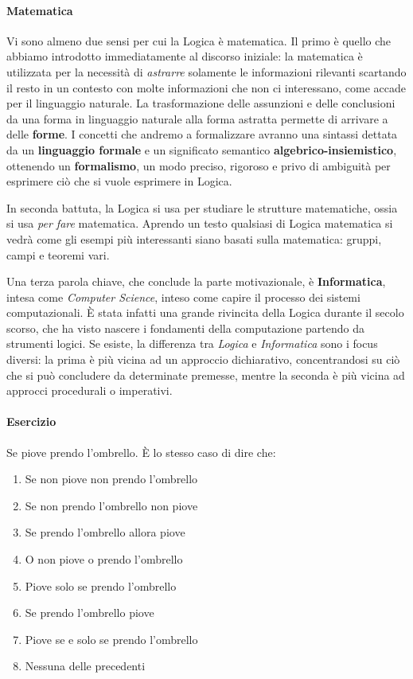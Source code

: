 \paragraph{Matematica}
Vi sono almeno due sensi per cui la Logica è matematica. Il primo è quello che abbiamo 
introdotto immediatamente al discorso iniziale: la matematica è utilizzata per 
la necessità di \textit{astrarre} solamente le informazioni rilevanti scartando 
il resto in un contesto con molte informazioni che non ci interessano, come 
accade per il linguaggio naturale. La trasformazione delle assunzioni e delle 
conclusioni da una forma in linguaggio naturale alla forma astratta permette 
di arrivare a delle \textbf{forme}. I concetti che andremo a formalizzare 
avranno una sintassi dettata da un \textbf{linguaggio formale} e un significato 
semantico \textbf{algebrico-insiemistico}, ottenendo un \textbf{formalismo}, un
modo preciso, rigoroso e privo di ambiguità per esprimere ciò che si vuole 
esprimere in Logica. 

In seconda battuta, la Logica si usa per studiare le strutture matematiche, 
ossia si usa \textit{per fare} matematica. Aprendo un testo qualsiasi di 
Logica matematica si vedrà come gli esempi più interessanti siano basati 
sulla matematica: gruppi, campi e teoremi vari. \newline


\noindent
Una terza parola chiave, che conclude la parte motivazionale, è \textbf{Informatica}, 
intesa come \textit{Computer Science}, inteso come capire il processo dei 
sistemi computazionali. \`E stata infatti una grande rivincita della Logica 
durante il secolo scorso, che ha visto nascere i fondamenti della computazione 
partendo da strumenti logici. Se esiste, la differenza tra \textit{Logica} 
e \textit{Informatica} sono i focus diversi: la prima è più vicina ad un 
approccio dichiarativo, concentrandosi su ciò che si può concludere da 
determinate premesse, mentre la seconda è più vicina ad approcci 
procedurali o imperativi.

\paragraph{Esercizio}
Se piove prendo l'ombrello. \`E lo stesso caso di dire che: 
\begin{enumerate}
  \setlength\itemsep{0pt}
  \item Se non piove non prendo l'ombrello
  \item Se non prendo l'ombrello non piove
  \item Se prendo l'ombrello allora piove
  \item O non piove o prendo l'ombrello 
  \item Piove solo se prendo l'ombrello 
  \item Se prendo l'ombrello piove 
  \item Piove se e solo se prendo l'ombrello
  \item Nessuna delle precedenti
\end{enumerate}

